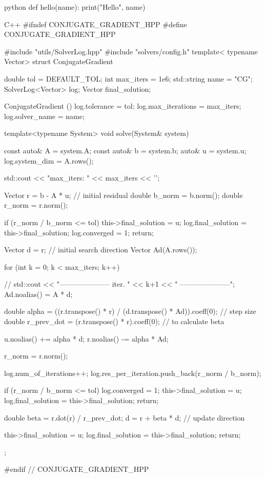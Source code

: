 \begin{codeblock}{python}
def hello(name):
    print("Hello", name)
\end{codeblock}

\begin{codeblock}{C++}
#ifndef CONJUGATE_GRADIENT_HPP
#define CONJUGATE_GRADIENT_HPP

#include "utils/SolverLog.hpp"
#include "solvers/config.h"
template< typename Vector>
struct ConjugateGradient
{
    double              tol       = DEFAULT_TOL;
    int                 max_iters = 1e6;
    std::string         name      = "CG";
    SolverLog<Vector>   log;
    Vector              final_solution;

    ConjugateGradient ()
    {
        log.tolerance      = tol;
        log.max_iterations = max_iters;
        log.solver_name    = name;
    }

    template<typename System>
    void solve(System& system)
    {   
        const auto&  A = system.A;
        const auto&  b = system.b;
        auto&        u = system.u;
        log.system_dim = A.rows();

        std::cout << "max_iters: " << max_iters << '\n';

        Vector r      = b - A * u; // initial residual
        double b_norm = b.norm();
        double r_norm = r.norm();

        if (r_norm / b_norm <= tol) 
        {   
            this->final_solution = u;
            log.final_solution   = this->final_solution;
            log.converged        = 1;
            return;
        }

        Vector d = r; // initial search direction
        Vector Ad(A.rows());

        for (int k = 0; k < max_iters; k++)
        {   
            // std::cout << "--------------------- iter. " << k+1 << " ---------------------\n";
            Ad.noalias() = A * d;

            double alpha      = ((r.transpose() * r) / (d.transpose() * Ad)).coeff(0); // step size
            double r_prev_dot = (r.transpose() * r).coeff(0); // to calculate beta

            u.noalias() += alpha * d;
            r.noalias() -= alpha * Ad;

            r_norm = r.norm();
            
            log.num_of_iterations++;
            log.res_per_iteration.push_back(r_norm / b_norm);

            if (r_norm / b_norm <= tol) 
            {   
                log.converged        = 1;
                this->final_solution = u;
                log.final_solution   = this->final_solution;
                return;
            }

            double beta = r.dot(r) / r_prev_dot;
            d           = r + beta * d; // update direction
        }
        this->final_solution = u;
        log.final_solution   = this->final_solution;
        return;
    }
};

#endif // CONJUGATE_GRADIENT_HPP
\end{codeblock}